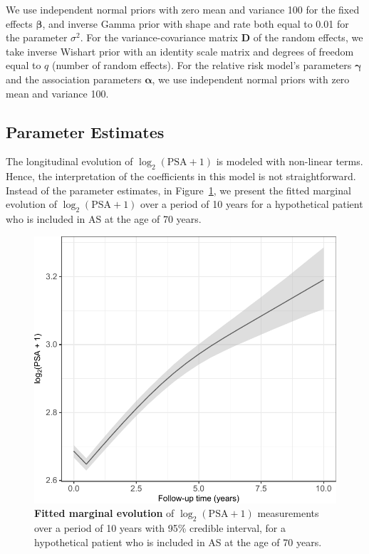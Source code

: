 \begin{subappendices}
We use independent normal priors with zero mean and variance 100 for the fixed effects $\boldsymbol{\beta}$, and inverse Gamma prior with shape and rate both equal to 0.01 for the parameter $\sigma^2$. For the variance-covariance matrix $\boldsymbol{D}$ of the random effects, we take inverse Wishart prior with an identity scale matrix and degrees of freedom equal to $q$ (number of random effects). For the relative risk model's parameters $\boldsymbol{\gamma}$ and the association parameters $\boldsymbol{\alpha}$, we use independent normal priors with zero mean and variance 100.

\subsection{Parameter Estimates}
The longitudinal evolution of $\log_2 (\mbox{PSA} + 1)$ is modeled with non-linear terms. Hence, the interpretation of the coefficients in this model is not straightforward. Instead of the parameter estimates, in Figure~\ref{c2:fig:app1}, we present the fitted marginal evolution of $\log_2 (\mbox{PSA} + 1)$ over a period of 10 years for a hypothetical patient who is included in AS at the age of 70 years. 


\begin{figure}
\includegraphics{contents/c2/images/c2_fig_app1.pdf}
\caption{\textbf{Fitted marginal evolution} of $\log_2(\mbox{PSA} + 1)$ measurements over a period of 10 years with 95\% credible interval, for a hypothetical patient who is included in AS at the age of 70 years.}
\label{c2:fig:app1}
\end{figure}


\end{subappendices}
